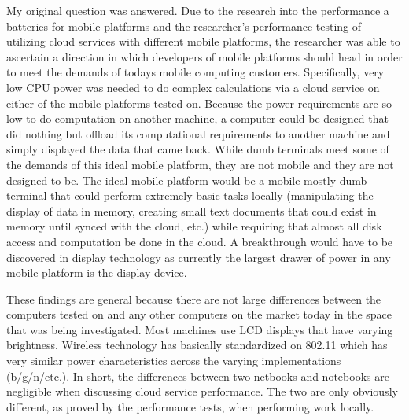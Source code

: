 
My original question was answered.  Due to the research into the performance a
batteries for mobile platforms and the researcher's performance testing of
utilizing cloud services with different mobile platforms, the researcher was
able to ascertain a direction in which developers of mobile platforms should
head in order to meet the demands of todays mobile computing customers.
Specifically, very low CPU power was needed to do complex calculations via a
cloud service on either of the mobile platforms tested on.  Because the power
requirements are so low to do computation on another machine, a computer could
be designed that did nothing but offload its computational requirements to
another machine and simply displayed the data that came back.  While dumb
terminals meet some of the demands of this ideal mobile platform, they are not
mobile and they are not designed to be.  The ideal mobile platform would be a
mobile mostly-dumb terminal that could perform extremely basic tasks locally
(manipulating the display of data in memory, creating small text documents that
could exist in memory until synced with the cloud, etc.) while requiring that
almost all disk access and computation be done in the cloud.  A breakthrough
would have to be discovered in display technology as currently the largest
drawer of power in any mobile platform is the display device.


These findings are general because there are not large differences between the
computers tested on and any other computers on the market today in the space
that was being investigated.  Most machines use LCD displays that have varying
brightness.  Wireless technology has basically standardized on 802.11 which has
very similar power characteristics across the varying implementations
(b/g/n/etc.).  In short, the differences between two netbooks and notebooks are
negligible when discussing cloud service performance.  The two are only
obviously different, as proved by the performance tests, when performing work
locally.

